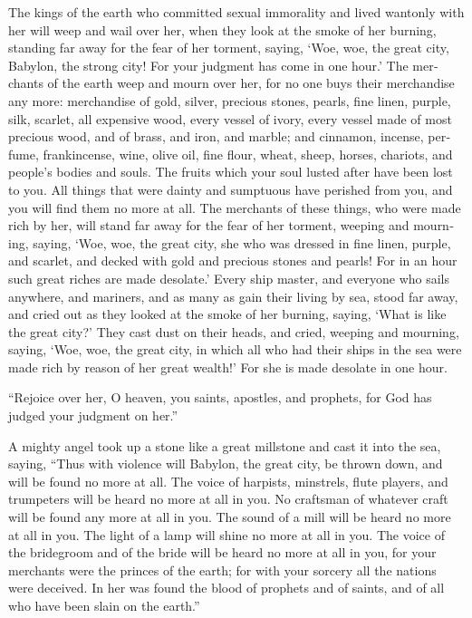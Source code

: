 \begin{paracols}{2}
\begin{english}
 The kings of the earth who committed sexual immorality and lived wantonly with her will weep and wail over her, when they look at the smoke of her burning,  standing far away for the fear of her torment, saying, ‘Woe, woe, the great city, Babylon, the strong city! For your judgment has come in one hour.’  The merchants of the earth weep and mourn over her, for no one buys their merchandise any more:  merchandise of gold, silver, precious stones, pearls, fine linen, purple, silk, scarlet, all expensive wood, every vessel of ivory, every vessel made of most precious wood, and of brass, and iron, and marble;  and cinnamon, incense, perfume, frankincense, wine, olive oil, fine flour, wheat, sheep, horses, chariots, and people’s bodies and souls.  The fruits which your soul lusted after have been lost to you. All things that were dainty and sumptuous have perished from you, and you will find them no more at all.  The merchants of these things, who were made rich by her, will stand far away for the fear of her torment, weeping and mourning,  saying, ‘Woe, woe, the great city, she who was dressed in fine linen, purple, and scarlet, and decked with gold and precious stones and pearls!  For in an hour such great riches are made desolate.’ Every ship master, and everyone who sails anywhere, and mariners, and as many as gain their living by sea, stood far away,  and cried out as they looked at the smoke of her burning, saying, ‘What is like the great city?’  They cast dust on their heads, and cried, weeping and mourning, saying, ‘Woe, woe, the great city, in which all who had their ships in the sea were made rich by reason of her great wealth!’ For she is made desolate in one hour. 

 “Rejoice over her, O heaven, you saints, apostles, and prophets, for God has judged your judgment on her.” 

 A mighty angel took up a stone like a great millstone and cast it into the sea, saying, “Thus with violence will Babylon, the great city, be thrown down, and will be found no more at all.  The voice of harpists, minstrels, flute players, and trumpeters will be heard no more at all in you. No craftsman of whatever craft will be found any more at all in you. The sound of a mill will be heard no more at all in you.  The light of a lamp will shine no more at all in you. The voice of the bridegroom and of the bride will be heard no more at all in you, for your merchants were the princes of the earth; for with your sorcery all the nations were deceived.  In her was found the blood of prophets and of saints, and of all who have been slain on the earth.” 


\end{english}
\end{paracols}
